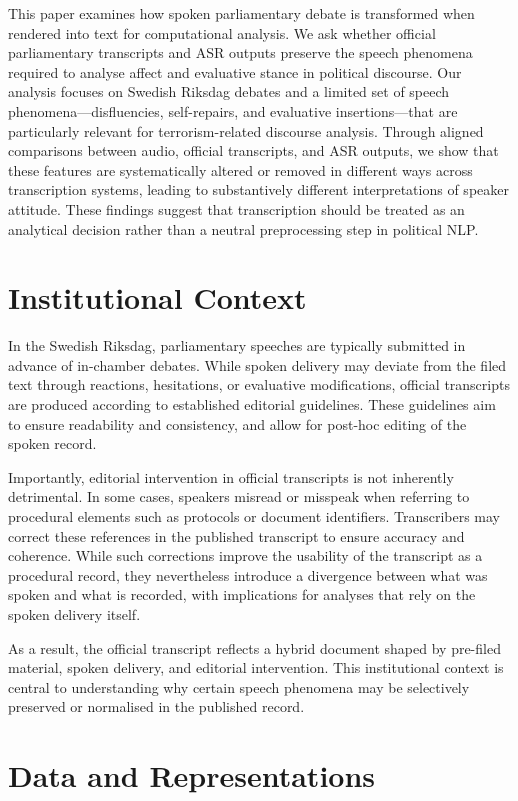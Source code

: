 \documentclass[10pt, a4paper]{article}
\begin{document}
This paper examines how spoken parliamentary debate is transformed when rendered into text for computational analysis. We ask whether official parliamentary transcripts and ASR outputs preserve the speech phenomena required to analyse affect and evaluative stance in political discourse. Our analysis focuses on Swedish Riksdag debates and a limited set of speech phenomena—disfluencies, self-repairs, and evaluative insertions—that are particularly relevant for terrorism-related discourse analysis. Through aligned comparisons between audio, official transcripts, and ASR outputs, we show that these features are systematically altered or removed in different ways across transcription systems, leading to substantively different interpretations of speaker attitude. These findings suggest that transcription should be treated as an analytical decision rather than a neutral preprocessing step in political NLP.

\section{Institutional Context}

In the Swedish Riksdag, parliamentary speeches are typically submitted in advance of in-chamber debates. While spoken delivery may deviate from the filed text through reactions, hesitations, or evaluative modifications, official transcripts are produced according to established editorial guidelines. These guidelines aim to ensure readability and consistency, and allow for post-hoc editing of the spoken record.

Importantly, editorial intervention in official transcripts is not inherently detrimental. In some cases, speakers misread or misspeak when referring to procedural elements such as protocols or document identifiers. Transcribers may correct these references in the published transcript to ensure accuracy and coherence. While such corrections improve the usability of the transcript as a procedural record, they nevertheless introduce a divergence between what was spoken and what is recorded, with implications for analyses that rely on the spoken delivery itself.

As a result, the official transcript reflects a hybrid document shaped by pre-filed material, spoken delivery, and editorial intervention. This institutional context is central to understanding why certain speech phenomena may be selectively preserved or normalised in the published record.

\section{Data and Representations}
\end{document}
